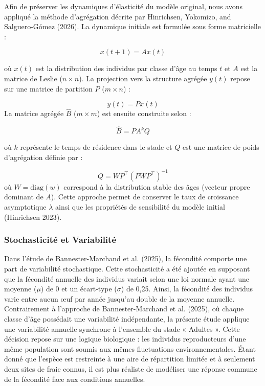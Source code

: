 \documentclass[9pt,twocolumn,twoside,]{pnas-new}
\begin{document}
Afin de préserver les dynamiques d'élasticité du modèle original, nous
avons appliqué la méthode d'agrégation décrite par Hinrichsen, Yokomizo,
and Salguero-Gómez (2026). La dynamique initiale est formulée sous forme
matricielle :

\[
x(t+1) = Ax(t)
\]

\noindent où \(x(t)\) est la distribution des individus par classe d'âge
au temps \(t\) et \(A\) est la matrice de Leslie (\(n \times n\)). La
projection vers la structure agrégée \(y(t)\) repose sur une matrice de
partition \(P\) (\(m \times n\)) :

\[
y(t) = Px(t)
\] La matrice agrégée \(\hat{B}\) (\(m \times m\)) est ensuite
construite selon :

\[
\hat{B} = PA^kQ
\]

\noindent où \(k\) représente le temps de résidence dans le stade et
\(Q\) est une matrice de poids d'agrégation définie par :

\[
Q = WP^\top(PWP^\top)^{-1}
\] \noindent où \(W = \text{diag}(w)\) correspond à la distribution
stable des âges (vecteur propre dominant de \(A\)). Cette approche
permet de conserver le taux de croissance asymptotique \(\lambda\) ainsi
que les propriétés de sensibilité du modèle initial (Hinrichsen 2023).

\subsubsection*{Stochasticité et
Variabilité}\label{stochasticituxe9-et-variabilituxe9}

Dans l'étude de Bannester-Marchand et al. (2025), la fécondité comporte
une part de variabilité stochastique. Cette stochasticité a été ajoutée
en supposant que la fécondité annuelle des individus variait selon une
loi normale ayant une moyenne (\(\mu\)) de 0 et un écart-type
(\(\sigma\)) de 0,25. Ainsi, la fécondité des individus varie entre
aucun œuf par année jusqu'au double de la moyenne annuelle.
Contrairement à l'approche de Bannester-Marchand et al. (2025), où
chaque classe d'âge possédait une variabilité indépendante, la présente
étude applique une variabilité annuelle synchrone à l'ensemble du stade
« Adultes ». Cette décision repose sur une logique biologique : les
individus reproducteurs d'une même population sont soumis aux mêmes
fluctuations environnementales. Étant donné que l'espèce est restreinte
à une aire de répartition limitée et à seulement deux sites de fraie
connus, il est plus réaliste de modéliser une réponse commune de la
fécondité face aux conditions annuelles.
\end{document}
